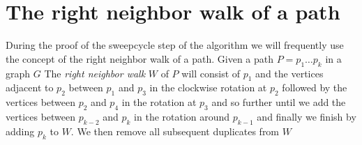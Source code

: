 
\section{The right neighbor walk of a path}
  During the proof of the sweepcycle step of the algorithm we will frequently use the concept of the right neighbor walk of a path.
  Given a path $P = p_1 \ldots p_k$ in a graph $G$
  The \emph{right neighbor walk} $W$ of $P$ will consist of $p_1$ and the vertices adjacent to $p_{2}$ between $p_1$ and $p_{3}$ in the clockwise rotation at $p_{2}$ followed by the vertices between $p_{2}$ and $p_{4}$ in the rotation at $p_{3}$ and so further until we add the vertices between $p_{k-2}$ and $p_k$ in the rotation around $p_{k-1}$ and finally we finish by adding $p_k$ to $W$.
  We then remove all subsequent duplicates from $W$

